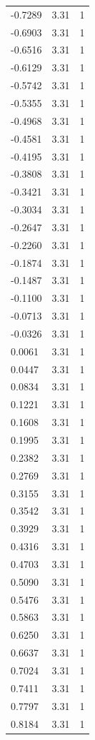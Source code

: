 \begin{longtable}{lrr}
  -0.7289 & 3.31 & 1 \\
  -0.6903 & 3.31 & 1 \\
  -0.6516 & 3.31 & 1 \\
  -0.6129 & 3.31 & 1 \\
  -0.5742 & 3.31 & 1 \\
  -0.5355 & 3.31 & 1 \\
  -0.4968 & 3.31 & 1 \\
  -0.4581 & 3.31 & 1 \\
  -0.4195 & 3.31 & 1 \\
  -0.3808 & 3.31 & 1 \\
  -0.3421 & 3.31 & 1 \\
  -0.3034 & 3.31 & 1 \\
  -0.2647 & 3.31 & 1 \\
  -0.2260 & 3.31 & 1 \\
  -0.1874 & 3.31 & 1 \\
  -0.1487 & 3.31 & 1 \\
  -0.1100 & 3.31 & 1 \\
  -0.0713 & 3.31 & 1 \\
  -0.0326 & 3.31 & 1 \\
  0.0061 & 3.31 & 1 \\
  0.0447 & 3.31 & 1 \\
  0.0834 & 3.31 & 1 \\
  0.1221 & 3.31 & 1 \\
  0.1608 & 3.31 & 1 \\
  0.1995 & 3.31 & 1 \\
  0.2382 & 3.31 & 1 \\
  0.2769 & 3.31 & 1 \\
  0.3155 & 3.31 & 1 \\
  0.3542 & 3.31 & 1 \\
  0.3929 & 3.31 & 1 \\
  0.4316 & 3.31 & 1 \\
  0.4703 & 3.31 & 1 \\
  0.5090 & 3.31 & 1 \\
  0.5476 & 3.31 & 1 \\
  0.5863 & 3.31 & 1 \\
  0.6250 & 3.31 & 1 \\
  0.6637 & 3.31 & 1 \\
  0.7024 & 3.31 & 1 \\
  0.7411 & 3.31 & 1 \\
  0.7797 & 3.31 & 1 \\
  0.8184 & 3.31 & 1 \\

\end{longtable}

